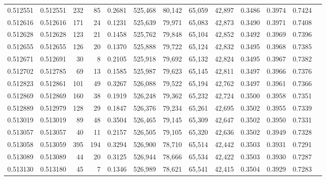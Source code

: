 \begin{tabular}{rrrrrrrrrrrrr}
0.512551 & 0.512551 &   232 &    85 &                                     0.2681 & 525,468 &  80,142 &  65,059 &  42,897 & 0.3486 & 0.3974 & 0.7424 \\
0.512616 & 0.512616 &   171 &    24 &                                     0.1231 & 525,639 &  79,971 &  65,083 &  42,873 & 0.3490 & 0.3971 & 0.7408 \\
0.512628 & 0.512628 &   123 &    21 &                                     0.1458 & 525,762 &  79,848 &  65,104 &  42,852 & 0.3492 & 0.3969 & 0.7396 \\
0.512655 & 0.512655 &   126 &    20 &                                     0.1370 & 525,888 &  79,722 &  65,124 &  42,832 & 0.3495 & 0.3968 & 0.7385 \\
0.512671 & 0.512691 &    30 &     8 &                                     0.2105 & 525,918 &  79,692 &  65,132 &  42,824 & 0.3495 & 0.3967 & 0.7382 \\
0.512702 & 0.512785 &    69 &    13 &                                     0.1585 & 525,987 &  79,623 &  65,145 &  42,811 & 0.3497 & 0.3966 & 0.7376 \\
0.512823 & 0.512861 &   101 &    49 &                                     0.3267 & 526,088 &  79,522 &  65,194 &  42,762 & 0.3497 & 0.3961 & 0.7366 \\
0.512869 & 0.512869 &   160 &    38 &                                     0.1919 & 526,248 &  79,362 &  65,232 &  42,724 & 0.3500 & 0.3958 & 0.7351 \\
0.512889 & 0.512979 &   128 &    29 &                                     0.1847 & 526,376 &  79,234 &  65,261 &  42,695 & 0.3502 & 0.3955 & 0.7339 \\
0.513019 & 0.513019 &    89 &    48 &                                     0.3504 & 526,465 &  79,145 &  65,309 &  42,647 & 0.3502 & 0.3950 & 0.7331 \\
0.513057 & 0.513057 &    40 &    11 &                                     0.2157 & 526,505 &  79,105 &  65,320 &  42,636 & 0.3502 & 0.3949 & 0.7328 \\
0.513058 & 0.513059 &   395 &   194 &                                     0.3294 & 526,900 &  78,710 &  65,514 &  42,442 & 0.3503 & 0.3931 & 0.7291 \\
0.513089 & 0.513089 &    44 &    20 &                                     0.3125 & 526,944 &  78,666 &  65,534 &  42,422 & 0.3503 & 0.3930 & 0.7287 \\
0.513130 & 0.513180 &    45 &     7 &                                     0.1346 & 526,989 &  78,621 &  65,541 &  42,415 & 0.3504 & 0.3929 & 0.7283 \\

\end{tabular}
